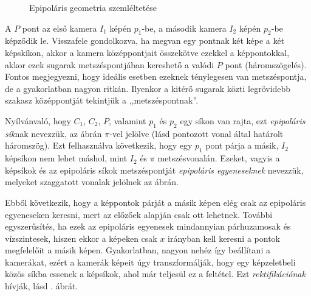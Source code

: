 \begin{figure}[tbh]
\caption{Epipoláris geometria szemléltetése \label{fig:epipolar}}
\end{figure}

A $P$ pont az első kamera $I_1$ képén $p_1$-be, a második kamera $I_2$ képén $p_2$-be képződik le. Visszafele gondolkozva, ha megvan egy pontnak két képe a két képskíkon, akkor a kamera középpontjait összekötve ezekkel a képpontokkal, akkor ezek sugarak metszéspontjában kereshető a valódi $P$ pont (háromszögelés). Fontos megjegyezni, hogy ideális esetben ezeknek ténylegesen van metszéspontja, de a gyakorlatban nagyon ritkán. Ilyenkor a kitérő sugarak közti legrövidebb szakasz középpontját tekintjük a ,,metszéspontnak''.

Nyílvánvaló, hogy $C_1$, $C_2$, $P$, valamint $p_1$ és $p_2$ egy síkon van rajta, ezt \textit{epipoláris sík}nak nevezzük, az ábrán $\pi$-vel jelölve (lásd pontozott vonal által határolt háromszög). Ezt felhasználva következik, hogy egy $p_1$ pont párja a másik, $I_2$ képsíkon nem lehet máshol, mint $I_2$ és $\pi$ metszésvonalán. Ezeket, vagyis a képsíkok és az epipoláris síkok metszéspontját \textit{epipoláris egyeneseknek} nevezzük, melyeket szaggatott vonalak jelölnek az ábrán.

Ebből következik, hogy a képpontok párját a másik képen elég csak az epipoláris egyeneseken keresni, mert az előzőek alapján csak ott lehetnek. További egyszerűsítés, ha ezek az epipoláris egyenesek mindannyian párhuzamosak és vízszintesek, hiszen ekkor a képeken csak $x$ irányban kell keresni a pontok megfelelőit a másik képen. Gyakorlatban, nagyon nehéz így beállítani a kamerákat, ezért a kamerák képeit úgy transzformálják, hogy egy képzeletbeli közös síkba essenek a képsíkok, ahol már teljesül ez a feltétel. Ezt \textit{rektifikációnak} hívják, lásd . ábrát.

